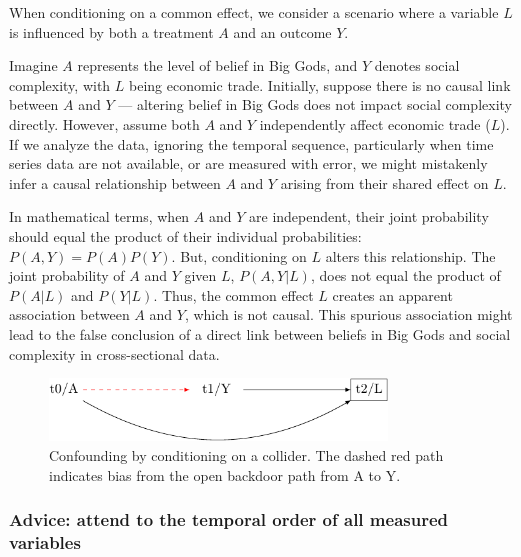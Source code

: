 \documentclass[
  singlecolumn,
  9pt]{article}
\begin{document}
When conditioning on a common effect, we consider a scenario where a
variable \(L\) is influenced by both a treatment \(A\) and an outcome
\(Y\).

Imagine \(A\) represents the level of belief in Big Gods, and \(Y\)
denotes social complexity, with \(L\) being economic trade. Initially,
suppose there is no causal link between \(A\) and \(Y\) --- altering
belief in Big Gods does not impact social complexity directly. However,
assume both \(A\) and \(Y\) independently affect economic trade (\(L\)).
If we analyze the data, ignoring the temporal sequence, particularly
when time series data are not available, or are measured with error, we
might mistakenly infer a causal relationship between \(A\) and \(Y\)
arising from their shared effect on \(L\).

In mathematical terms, when \(A\) and \(Y\) are independent, their joint
probability should equal the product of their individual probabilities:
\(P(A, Y) = P(A)P(Y)\). But, conditioning on \(L\) alters this
relationship. The joint probability of \(A\) and \(Y\) given \(L\),
\(P(A, Y | L)\), does not equal the product of \(P(A | L)\) and
\(P(Y | L)\). Thus, the common effect \(L\) creates an apparent
association between \(A\) and \(Y\), which is not causal. This spurious
association might lead to the false conclusion of a direct link between
beliefs in Big Gods and social complexity in cross-sectional data.

\begin{figure}

{\centering \includegraphics[width=0.8\textwidth,height=\textheight]{causal-dags_files/figure-pdf/fig-dag-common-effect-1.pdf}

}

\caption{\label{fig-dag-common-effect}Confounding by conditioning on a
collider. The dashed red path indicates bias from the open backdoor path
from A to Y.}

\end{figure}

\subsubsection{Advice: attend to the temporal order of all measured
variables}\label{advice-attend-to-the-temporal-order-of-all-measured-variables}
\end{document}

